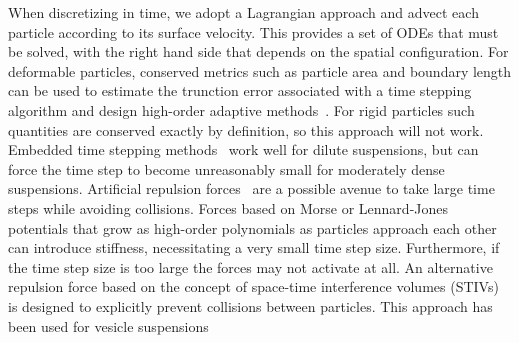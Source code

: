 \documentclass[preprint, 10pt]{elsarticle}
\begin{document}

When discretizing in time, we adopt a Lagrangian approach and advect
each particle according to its surface velocity. This provides a set of
ODEs that must be solved, with the right hand side that depends on the
spatial configuration. For deformable particles, conserved metrics such
as particle area and boundary length can be used to estimate the
trunction error associated with a time stepping algorithm and design
high-order adaptive methods~\cite{Quaife2015, Quaife2015a}. For rigid
particles such quantities are conserved exactly by definition, so this
approach will not work. Embedded time stepping
methods~\cite{kli-tor2014} work well for dilute suspensions, but can
force the time step to become unreasonably small for moderately dense
suspensions. Artificial repulsion forces~\cite{Flormann2017, Liu2006,
Malhotra2018, Lu2017} are a possible avenue to take large time steps
while avoiding collisions. Forces based on Morse or Lennard-Jones
potentials that grow as high-order polynomials as particles approach
each other~\cite{Flormann2017, Liu2006} can introduce stiffness,
necessitating a very small time step size. Furthermore, if the time step
size is too large the forces may not activate at all. An alternative
repulsion force based on the concept of space-time interference volumes
(STIVs)~\cite{Harmon2011, Lu2017} is designed to explicitly prevent
collisions between particles. This approach has been used for vesicle
suspensions 
\end{document}
